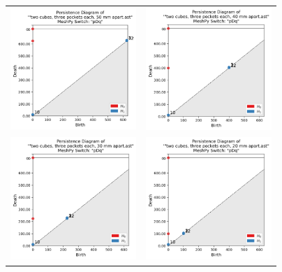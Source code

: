\documentclass[ma]{uncgdissertationexp}
\theoremstyle{plain}
\theoremstyle{definition}
\theoremstyle{remark}
\begin{document}
\begin{table}[H]
\begin{center}
    \begin{tabular}{cc}
         \includegraphics[width=1.875in]{Final Run, (two cubes, three pockets each, 50 mm apart) persdia.png} &
         \includegraphics[width=1.875in]{Final Run, (two cubes, three pockets each, 40 mm apart) persdia.png} \\ 
         \includegraphics[width=1.875in]{Final Run, (two cubes, three pockets each, 30 mm apart) persdia.png} &
         \includegraphics[width=1.875in]{Final Run, (two cubes, three pockets each, 20 mm apart) persdia.png} \\ 

\end{tabular}
\end{center}
\end{table}
\end{document}

